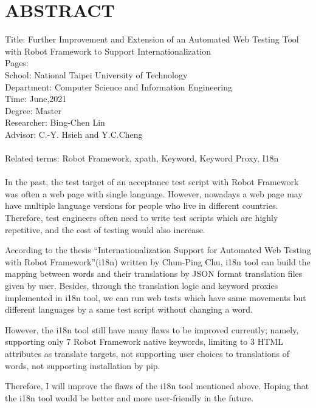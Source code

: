 \chapter*{ABSTRACT}


\noindent
Title: Further Improvement and Extension of an Automated Web Testing Tool 
with Robot Framework to Support Internationalization\\
Pages: \\
School: National Taipei University of Technology\\
Department: Computer Science and Information Engineering\\
Time: June,2021\\
Degree: Master\\
Researcher: Bing-Chen Lin\\
Advisor: C.-Y. Hsieh and Y.C.Cheng\\
\hspace*{\fill}\\
Related terms: Robot Framework, xpath, Keyword, Keyword Proxy, I18n\\
\hspace*{\fill}\\
%
\indent
In the past, the test target of an acceptance test script with Robot Framework 
was often a  web page with single language. However, 
nowadays a web page may have multiple language versions for people 
who live in different countries. Therefore, test engineers often need to 
write test scripts which are highly repetitive, 
and the cost of testing would also increase.

According to the thesis “Internationalization Support for Automated Web Testing
with Robot Framework”(i18n) written by Chun-Ping Chu, i18n tool can build 
the mapping between words and their translations by JSON format translation 
files given by user. Besides, through the translation logic and 
keyword proxies implemented in i18n tool, we can run web tests which have 
same movements but different languages by a same test script without changing a word.

However, the i18n tool still have many flaws to be improved currently; namely, 
supporting only 7 Robot Framework native keywords, limiting to 3 HTML attributes as translate targets, 
not supporting user choices to translations of words, not supporting installation by pip.

Therefore, I will improve the flaws of the i18n tool mentioned above. 
Hoping that the i18n tool would be better and more user-friendly in the future.

